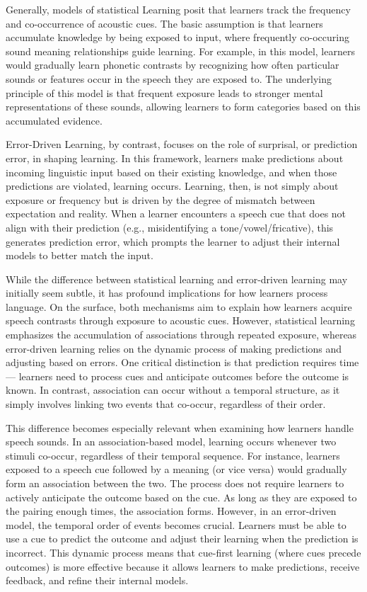 Generally, models of statistical Learning posit that learners track the frequency and co-occurrence of acoustic cues. The basic assumption is that learners accumulate knowledge by being exposed to input, where frequently co-occuring sound meaning relationships guide learning. For example, in this model, learners would gradually learn phonetic contrasts by recognizing how often particular sounds or features occur in the speech they are exposed to. The underlying principle of this model is that frequent exposure leads to stronger mental representations of these sounds, allowing learners to form categories based on this accumulated evidence. 

Error-Driven Learning, by contrast, focuses on the role of surprisal, or prediction error, in shaping learning. In this framework, learners make predictions about incoming linguistic input based on their existing knowledge, and when those predictions are violated, learning occurs. Learning, then, is not simply about exposure or frequency but is driven by the degree of mismatch between expectation and reality. When a learner encounters a speech cue that does not align with their prediction (e.g., misidentifying a tone/vowel/fricative), this generates prediction error, which prompts the learner to adjust their internal models to better match the input. 

While the difference between statistical learning and error-driven learning may initially seem subtle, it has profound implications for how learners process language. On the surface, both mechanisms aim to explain how learners acquire speech contrasts through exposure to acoustic cues. However, statistical learning emphasizes the accumulation of associations through repeated exposure, whereas error-driven learning relies on the dynamic process of making predictions and adjusting based on errors. One critical distinction is that prediction requires time— learners need to process cues and anticipate outcomes before the outcome is known. In contrast, association can occur without a temporal structure, as it simply involves linking two events that co-occur, regardless of their order.

This difference becomes especially relevant when examining how learners handle speech sounds. In an association-based model, learning occurs whenever two stimuli co-occur, regardless of their temporal sequence. For instance, learners exposed to a speech cue followed by a meaning (or vice versa) would gradually form an association between the two. The process does not require learners to actively anticipate the outcome based on the cue. As long as they are exposed to the pairing enough times, the association forms. However, in an error-driven model, the temporal order of events becomes crucial. Learners must be able to use a cue to predict the outcome and adjust their learning when the prediction is incorrect. This dynamic process means that cue-first learning (where cues precede outcomes) is more effective because it allows learners to make predictions, receive feedback, and refine their internal models.

